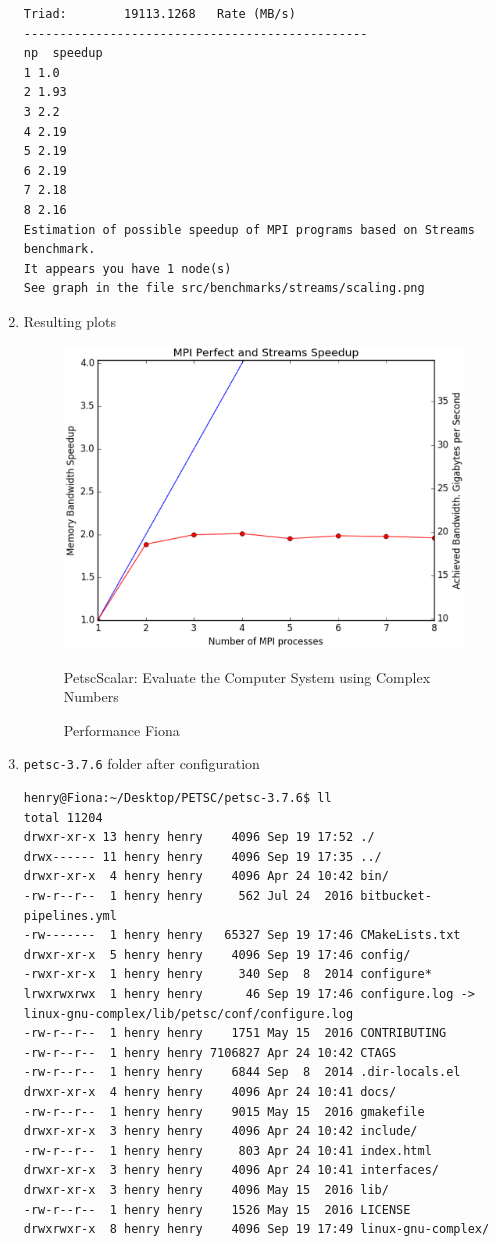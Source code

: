 \documentclass{article}
\begin{document}
\begin{enumerate}
\begin{verbatim}
Triad:        19113.1268   Rate (MB/s) 
------------------------------------------------
np  speedup
1 1.0
2 1.93
3 2.2
4 2.19
5 2.19
6 2.19
7 2.18
8 2.16
Estimation of possible speedup of MPI programs based on Streams benchmark.
It appears you have 1 node(s)
See graph in the file src/benchmarks/streams/scaling.png
\end{verbatim}
\normalsize
\item Resulting plots
\begin{figure}[htp]
    \centering
    \includegraphics[width=.8\textwidth, height=.3\textwidth]{petsc_3_7_6_with_fftw_and_complex_number_configuration_scaling.eps}
    \caption*{PetscScalar: Evaluate the Computer System using Complex Numbers}
    \caption{Performance Fiona}
    \label{checkerboard_lattice}
\end{figure}
\item \verb+petsc-3.7.6+ folder after configuration
\tiny
\begin{verbatim}
henry@Fiona:~/Desktop/PETSC/petsc-3.7.6$ ll
total 11204
drwxr-xr-x 13 henry henry    4096 Sep 19 17:52 ./
drwx------ 11 henry henry    4096 Sep 19 17:35 ../
drwxr-xr-x  4 henry henry    4096 Apr 24 10:42 bin/
-rw-r--r--  1 henry henry     562 Jul 24  2016 bitbucket-pipelines.yml
-rw-------  1 henry henry   65327 Sep 19 17:46 CMakeLists.txt
drwxr-xr-x  5 henry henry    4096 Sep 19 17:46 config/
-rwxr-xr-x  1 henry henry     340 Sep  8  2014 configure*
lrwxrwxrwx  1 henry henry      46 Sep 19 17:46 configure.log -> linux-gnu-complex/lib/petsc/conf/configure.log
-rw-r--r--  1 henry henry    1751 May 15  2016 CONTRIBUTING
-rw-r--r--  1 henry henry 7106827 Apr 24 10:42 CTAGS
-rw-r--r--  1 henry henry    6844 Sep  8  2014 .dir-locals.el
drwxr-xr-x  4 henry henry    4096 Apr 24 10:41 docs/
-rw-r--r--  1 henry henry    9015 May 15  2016 gmakefile
drwxr-xr-x  3 henry henry    4096 Apr 24 10:42 include/
-rw-r--r--  1 henry henry     803 Apr 24 10:41 index.html
drwxr-xr-x  3 henry henry    4096 Apr 24 10:41 interfaces/
drwxr-xr-x  3 henry henry    4096 May 15  2016 lib/
-rw-r--r--  1 henry henry    1526 May 15  2016 LICENSE
drwxrwxr-x  8 henry henry    4096 Sep 19 17:49 linux-gnu-complex/

\end{verbatim}
\end{enumerate}
\end{document}
